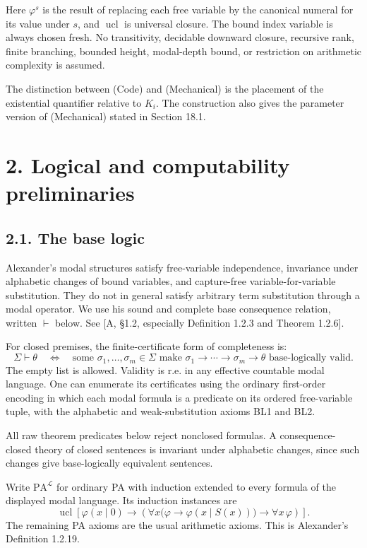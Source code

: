 \documentclass[
  11pt,
  letterpaper,
]{article}
\begin{document}
Here \(\varphi^s\) is the result of replacing each free variable by the
canonical numeral for its value under \(s\), and \(\operatorname{ucl}\)
is universal closure. The bound index variable is always chosen fresh.
No transitivity, decidable downward closure, recursive rank, finite
branching, bounded height, modal-depth bound, or restriction on
arithmetic complexity is assumed.

The distinction between (Code) and (Mechanical) is the placement of the
existential quantifier relative to \(K_i\). The construction also gives
the parameter version of (Mechanical) stated in Section 18.1.

\section{2. Logical and computability
preliminaries}\label{logical-and-computability-preliminaries}

\subsection{2.1. The base logic}\label{the-base-logic}

Alexander's modal structures satisfy free-variable independence,
invariance under alphabetic changes of bound variables, and capture-free
variable-for-variable substitution. They do not in general satisfy
arbitrary term substitution through a modal operator. We use his sound
and complete base consequence relation, written \(\vdash\) below. See
{[}A, §1.2, especially Definition 1.2.3 and Theorem 1.2.6{]}.

For closed premises, the finite-certificate form of completeness is: \[
\Sigma\vdash\theta
\quad\Longleftrightarrow\quad
\text{some }\sigma_1,\ldots,\sigma_m\in\Sigma
\text{ make }
\sigma_1\to\cdots\to\sigma_m\to\theta
\text{ base-logically valid}.
\tag{L1}
\] The empty list is allowed. Validity is r.e. in any effective
countable modal language. One can enumerate its certificates using the
ordinary first-order encoding in which each modal formula is a predicate
on its ordered free-variable tuple, with the alphabetic and
weak-substitution axioms BL1 and BL2.

All raw theorem predicates below reject nonclosed formulas. A
consequence-closed theory of closed sentences is invariant under
alphabetic changes, since such changes give base-logically equivalent
sentences.

Write \(\mathrm{PA}^{\mathcal L}\) for ordinary PA with induction
extended to every formula of the displayed modal language. Its induction
instances are \[
\operatorname{ucl}\left[
\varphi(x\mid0)\to
\left(\forall x\bigl(\varphi\to\varphi(x\mid S(x))\bigr)
 \to\forall x\,\varphi\right)\right].
\tag{L2}
\] The remaining PA axioms are the usual arithmetic axioms. This is
Alexander's Definition 1.2.19.
\end{document}
